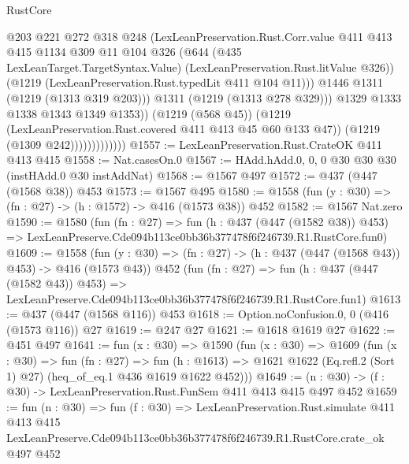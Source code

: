 \begin{lexlean}{RustCore}
\begin{coremodule}
                                  @203
                                  @221
                                  @272
                                  @318
                                  @248
                                  (LexLeanPreservation.Rust.Corr.value
                                    @411
                                    @413
                                    @415
                                    @1134
                                    @309
                                    @11
                                    @104
                                    @326
                                    (@644
                                      (@435 LexLeanTarget.TargetSyntax.Value)
                                      (LexLeanPreservation.Rust.litValue @326))
                                    (@1219 (LexLeanPreservation.Rust.typedLit @411 @104 @11)))
                                  @1446
                                  @1311
                                  (@1219 (@1313 @319 @203)))
                                @1311
                                (@1219 (@1313 @278 @329)))
                              @1329
                              @1333
                              @1338
                              @1343
                              @1349
                              @1353))
                          (@1219 (@568 @45))
                          (@1219 (LexLeanPreservation.Rust.covered @411 @413 @45 @60 @133 @47))
                          (@1219 (@1309 @242)))))))))))))
@1557 := LexLeanPreservation.Rust.CrateOK @411 @413 @415
@1558 := Nat.casesOn.{0}
@1567 := HAdd.hAdd.{0, 0, 0} @30 @30 @30 (instHAdd.{0} @30 instAddNat)
@1568 := @1567 @497
@1572 := @437 (@447 (@1568 @38)) @453
@1573 := @1567 @495
@1580 := @1558 (fun (y : @30) => (fn : @27) -> (h : @1572) -> @416 (@1573 @38)) @452
@1582 := @1567 Nat.zero
@1590 := @1580
    (fun (fn : @27) =>
    fun (h : @437 (@447 (@1582 @38)) @453) =>
    LexLeanPreserve.Cde094b113ce0bb36b377478f6f246739.R1.RustCore.fun0)
@1609 := @1558
    (fun (y : @30) => (fn : @27) -> (h : @437 (@447 (@1568 @43)) @453) -> @416 (@1573 @43))
    @452
    (fun (fn : @27) =>
    fun (h : @437 (@447 (@1582 @43)) @453) =>
    LexLeanPreserve.Cde094b113ce0bb36b377478f6f246739.R1.RustCore.fun1)
@1613 := @437 (@447 (@1568 @116)) @453
@1618 := Option.noConfusion.{0, 0} (@416 (@1573 @116)) @27
@1619 := @247 @27
@1621 := @1618 @1619 @27
@1622 := @451 @497
@1641 := fun (x : @30) =>
  @1590
    (fun (x : @30) =>
    @1609
      (fun (x : @30) =>
      fun (fn : @27) =>
      fun (h : @1613) =>
      @1621 @1622 (Eq.refl.{2} (Sort 1) @27) (heq_of_eq.{1} @436 @1619 @1622 @452)))
@1649 := (n : @30) -> (f : @30) -> LexLeanPreservation.Rust.FunSem @411 @413 @415 @497 @452
@1659 := fun (n : @30) =>
  fun (f : @30) =>
  LexLeanPreservation.Rust.simulate
    @411
    @413
    @415
    LexLeanPreserve.Cde094b113ce0bb36b377478f6f246739.R1.RustCore.crate_ok
    @497
    @452
\end{coremodule}
\end{lexlean}
